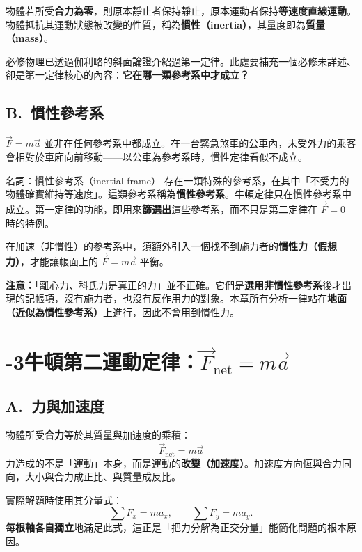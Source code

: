 \documentclass[11pt]{article}
\begin{document}
物體若所受\textbf{合力為零}，則原本靜止者保持靜止，原本運動者保持\textbf{等速度直線運動}。物體抵抗其運動狀態被改變的性質，稱為\textbf{慣性（inertia）}，其量度即為\textbf{質量（mass）}。

必修物理已透過伽利略的斜面論證介紹過第一定律。此處要補充一個必修未詳述、卻是第一定律核心的內容：\textbf{它在哪一類參考系中才成立？}

\subsection*{\sffamily B.\ 慣性參考系}

$\vec F=m\vec a$ 並非在任何參考系中都成立。在一台緊急煞車的公車內，未受外力的乘客會相對於車廂向前移動——以公車為參考系時，慣性定律看似不成立。

\begin{補充框}{名詞：慣性參考系（inertial frame）}
存在一類特殊的參考系，在其中「不受力的物體確實維持等速度」。這類參考系稱為\textbf{慣性參考系}。牛頓定律只在慣性參考系中成立。第一定律的功能，即用來\textbf{篩選出}這些參考系，而不只是第二定律在 $\vec F=0$ 時的特例。

在加速（非慣性）的參考系中，須額外引入一個找不到施力者的\textbf{慣性力（假想力）}，才能讓帳面上的 $\vec F=m\vec a$ 平衡。
\end{補充框}

\textbf{注意：}「離心力、科氏力是真正的力」並不正確。它們是\textbf{選用非慣性參考系}後才出現的記帳項，沒有施力者，也沒有反作用力的對象。本章所有分析一律站在\textbf{地面（近似為慣性參考系）}上進行，因此不會用到慣性力。

\section*{-3\quad 牛頓第二運動定律：$\vec F_{\text{net}}=m\vec a$}

\subsection*{\sffamily A.\ 力與加速度}

物體所受\textbf{合力}等於其質量與加速度的乘積：
$$\boxed{\;\vec F_{\text{net}} = m\vec a\;}$$
力造成的不是「運動」本身，而是運動的\textbf{改變（加速度）}。加速度方向恆與合力同向，大小與合力成正比、與質量成反比。

實際解題時使用其分量式：
$$\sum F_x = ma_x,\qquad \sum F_y = ma_y.$$
\textbf{每根軸各自獨立}地滿足此式，這正是「把力分解為正交分量」能簡化問題的根本原因。
\end{document}
